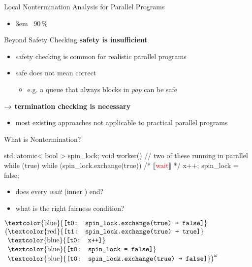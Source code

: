 \documentclass[aspectratio=169, fi]{paradise-slide}
\newcommand{\fcite}[1]{\emergencystretch 3em{\protect\NoHyper\cite{#1}}~\fullcite{#1}}
\newenvironment{prespart}[1]{%
  \begin{frame}{}%
    \centering
      {\Large #1} \par\bigskip\bigskip%
}{%
  \end{frame}%
}
\begin{document}
\begin{prespart}{Local Nontermination Analysis for Parallel Programs}
  \begin{itemize}
    \item \fcite{SB2019} \hfill 90\,\%
  \end{itemize}
\end{prespart}

\begin{frame}{Beyond Safety Checking}
  \textbf{safety is insufficient}
  \begin{itemize}
    \item safety checking is common for realistic parallel programs
    \item safe does not mean correct
      \begin{itemize}
        \item e.g. a queue that always blocks in \emph{pop} can be safe
      \end{itemize}
  \end{itemize}

  \bigskip
  \textbf{→ termination checking is necessary}
  \begin{itemize}
    \item most existing approaches not applicable to practical parallel programs
  \end{itemize}
\end{frame}

\begin{frame}[fragile]{What is Nontermination?}
  \begin{cppcode}
  std::atomic< bool > spin_lock;
  void worker() { // two of these running in parallel
      while (true) {
          while (spin_lock.exchange(true)) { /* ⟦\textcolor{red}{wait}⟧ */ }
          x++;
          spin_lock = false;
      }
  }
  \end{cppcode}

  \setlength{\leftmargini}{1em}
  \begin{itemize}
    \item does every \emph{wait} (inner ) end?
    \item what is the right fairness condition?
  \end{itemize}

  \bigskip
  \newcommand{\ta}[1]{\text{\textcolor{blue}{\texttt{[t0: #1]}}}}
  \newcommand{\tb}[1]{\text{\textcolor{red}{\texttt{[t1: #1]}}}}
  $\ta{spin\_lock.exchange(true) \textrightarrow{} false}$\\
  $\big(\tb{spin\_lock.exchange(true) \textrightarrow{} true}$\\
  $\phantom{\big(}\ta{x++}$\\
  $\phantom{\big(}\ta{spin\_lock = false}$\\
  $\phantom{\big(}\ta{spin\_lock.exchange(true) \textrightarrow{} false}\big)^\omega$
\end{frame}
\end{document}
